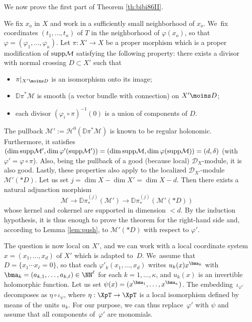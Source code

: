 \documentclass{amsart}
\theoremstyle{plain}
\numberwithin{theorem}{section}
\theoremstyle{definition}
\theoremstyle{remark}
\theoremstyle{definition}
\newcommand{\D}{\mathbb{D}}
\newcommand{\cD}{\mathcal{D}}
\newcommand{\cH}{\mathcal{H}}
\newcommand{\cM}{\mathcal{M}}
\newcommand{\supp}{\textup{supp}}
\begin{document}
We now prove the first part of Theorem \ref{th:bibi86II}.

\label{par:reductionnc}
We fix $x_o$ in $X$ and work in a sufficiently small neighborhood of $x_o$. We~fix coordinates $(t_1,\dots,t_\kappa)$ of $T$ in the neighborhood of $\varphi(x_o)$, so that $\varphi=(\varphi_1,\dots,\varphi_\kappa)$. Let $\pi:X'\to X$ be a proper morphism which is a proper modification of $\supp\cM$ satisfying the following property: there exists a divisor with normal crossing $D\subset X'$ such that
\begin{itemize}
\item
$\pi|_{X'\moins D}$ is an isomorphism onto its image;
\item
$\D\pi^*\cM$ is smooth (\ie a vector bundle with connection) on $X'\moins D$;
\item
each divisor $(\varphi_i\circ\pi)^{-1}(0)$ is a union of components of $D$.
\end{itemize}
The pullback $\cM':=\cH^0(\D\pi^*\cM)$ is known to be regular holonomic. Furthermore, it satisfies $(\dim\supp\cM',\dim\varphi'(\supp\cM'))=(\dim\supp\cM,\dim\varphi(\supp\cM))=(d,\delta)$ (with $\varphi'=\varphi\circ\pi$). Also, being the pullback of a good (because local) $\cD_X$-module, it is also good. Lastly, these properties also apply to the localized $\cD_{X'}$-module $\cM'(*D)$. Let us set $j=\dim X-\dim X'=\dim X-d$. Then there exists a natural adjunction morphism
\[
\cM\to\D\pi_*^{(j)}(\cM')\to\D\pi_*^{(j)}(\cM'(*D))
\]
whose kernel and cokernel are supported in dimension $<d$. By the induction hypothesis, it is thus enough to prove the theorem for the right-hand side and, according to Lemma \ref{lem:push}, to $\cM'(*D)$ with respect to $\varphi'$.

\label{par:endabsolute}
The question is now local on $X'$, and we can work with a local coordinate system $x=(x_1,\dots,x_d)$ of $X'$ which is adapted to~$D$. We~assume that $D=\{x_1\cdots x_\ell=0\}$, so that each $\varphi'_k(x_1,\dots,x_d)$ writes $u_k(x)x^{\bma_k}$ with $\bma_k=(a_{k,1},\dots,a_{k,\ell})\in\NN^\ell$ for each $k=1,\dots,\kappa$, and $u_k(x)$ is an invertible holomorphic function. Let us set $\psi(x)=(x^{\bma_1},\dots,x^{\bma_\kappa})$. The embedding~$\iota_{\varphi'}$ decomposes as $\eta\circ\iota_\psi$, where $\eta:\XpT\to \XpT$ is a local isomorphism defined by means of the units $u_k$. For our purpose, we can thus replace~$\varphi'$ with $\psi$ and assume that all components of~$\varphi'$ are monomials.
\end{document}

